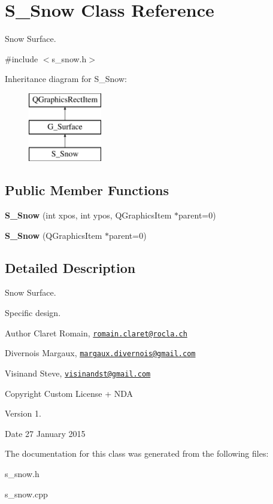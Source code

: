 \hypertarget{class_s___snow}{}\section{S\+\_\+\+Snow Class Reference}
\label{class_s___snow}


Snow Surface.  




{\ttfamily \#include $<$s\+\_\+snow.\+h$>$}

Inheritance diagram for S\+\_\+\+Snow\+:\begin{figure}[H]
\begin{center}
\leavevmode
\includegraphics[height=3.000000cm]{class_s___snow}
\end{center}
\end{figure}
\subsection*{Public Member Functions}
\begin{DoxyCompactItemize}
\item 
\hypertarget{class_s___snow_a58b5eb7552b3082d105e9968acc7a9fb}{}{\bfseries S\+\_\+\+Snow} (int xpos, int ypos, Q\+Graphics\+Item $\ast$parent=0)\label{class_s___snow_a58b5eb7552b3082d105e9968acc7a9fb}

\item 
\hypertarget{class_s___snow_a19a17d0be19ecb0f85b1feff5aab697f}{}{\bfseries S\+\_\+\+Snow} (Q\+Graphics\+Item $\ast$parent=0)\label{class_s___snow_a19a17d0be19ecb0f85b1feff5aab697f}

\end{DoxyCompactItemize}


\subsection{Detailed Description}
Snow Surface. 

Specific design. \begin{DoxyAuthor}{Author}
Claret Romain, \href{mailto:romain.claret@rocla.ch}{\tt romain.\+claret@rocla.\+ch} 

Divernois Margaux, \href{mailto:margaux.divernois@gmail.com}{\tt margaux.\+divernois@gmail.\+com} 

Visinand Steve, \href{mailto:visinandst@gmail.com}{\tt visinandst@gmail.\+com} 
\end{DoxyAuthor}
\begin{DoxyCopyright}{Copyright}
Custom License + N\+D\+A 
\end{DoxyCopyright}
\begin{DoxyVersion}{Version}
1. 
\end{DoxyVersion}
\begin{DoxyDate}{Date}
27 January 2015 
\end{DoxyDate}


The documentation for this class was generated from the following files\+:\begin{DoxyCompactItemize}
\item 
s\+\_\+snow.\+h\item 
s\+\_\+snow.\+cpp\end{DoxyCompactItemize}
